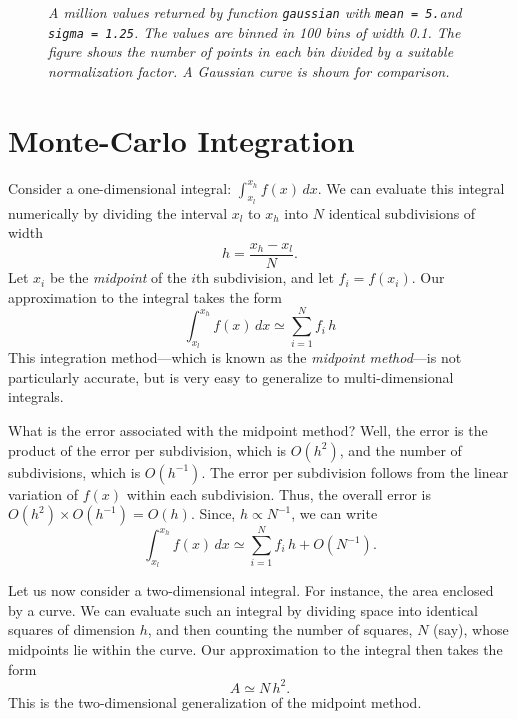 \begin{figure}
\epsfysize=3in
\centerline{}
\caption{\em A million values returned by function {\tt gaussian} with
{\tt mean = 5.}\@ and {\tt sigma = 1.25}. The values are binned
in 100 bins of width 0.1. The figure shows the number of points
in each bin divided by a suitable normalization factor. A Gaussian curve
is shown for comparison.}\label{rej1}
\end{figure}

\section{Monte-Carlo Integration}
Consider a one-dimensional integral: $\int_{x_l}^{x_h} f(x)\,dx$. We can evaluate this
integral numerically by dividing the interval $x_l$ to $x_h$ into $N$ identical subdivisions of
width
\begin{equation}
h = \frac{x_h-x_l}{N}.
\end{equation}
Let $x_i$ be the {\em midpoint} of the $i$th subdivision, and let $f_i = f(x_i)$.
Our approximation to the integral takes the form
\begin{equation}
\int_{x_l}^{x_h} f(x)\,dx\simeq \sum_{i=1}^{N} f_i\,h
\end{equation}
This integration method---which is known as the {\em midpoint method}---is not particularly
accurate, but is very easy to generalize to multi-dimensional integrals. 

	What is the  error associated with the midpoint method? Well, the error is the
product of the error per subdivision, which is $O(h^2)$, and the number of subdivisions,
which is $O(h^{-1})$. The error per subdivision follows from the linear variation
of $f(x)$ within each subdivision. Thus, the overall error is $O(h^2)\times O(h^{-1}) = 
O(h)$. Since, $h\propto N^{-1}$, we can write
\begin{equation}
\int_{x_l}^{x_h} f(x)\,dx\simeq \sum_{i=1}^{N} f_i\,h + O(N^{-1}).
\end{equation}

Let us now consider a two-dimensional integral. For instance, the area enclosed by a curve.
We can evaluate such an integral by dividing space into identical squares of dimension $h$,
and then counting the number of squares, $N$ (say), whose midpoints lie within the curve.
Our approximation to the integral  then takes the form
\begin{equation}
A \simeq N\,h^2.
\end{equation}
This is the two-dimensional generalization of the midpoint method.

